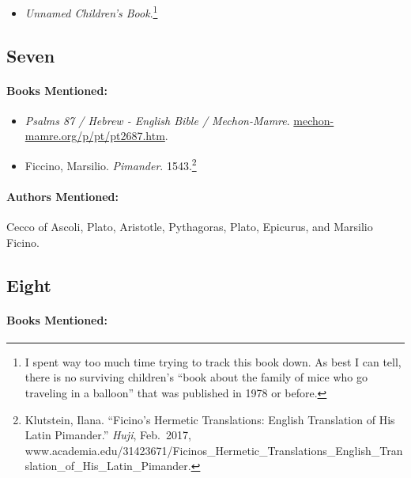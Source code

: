 \documentclass[12pt]{article}
\providecommand{\tightlist}{%
  \setlength{\itemsep}{0pt}\setlength{\parskip}{0pt}}
\begin{document}
\begin{itemize}
\tightlist
\item
  \emph{Unnamed Children's Book}.\footnote{I spent way too much time trying to track this book down. As best I can tell, there is no surviving children's ``book about the family of mice who go traveling in a balloon'' that was published in 1978 or before.}
\end{itemize}

\subsection{Seven}\label{seven-2}

\paragraph{Books Mentioned:}\label{books-mentioned-21}

\begin{itemize}
\tightlist
\item
  \emph{Psalms 87 / Hebrew - English Bible / Mechon-Mamre}. \url{mechon-mamre.org/p/pt/pt2687.htm}.
\item
  Ficcino, Marsilio. \emph{Pimander}. 1543.\footnote{Klutstein, Ilana. ``Ficino's Hermetic Translations: English Translation of His Latin Pimander.'' \emph{Huji}, Feb.~2017, www.academia.edu/31423671/Ficinos\_Hermetic\_Translations\_English\_Translation\_of\_His\_Latin\_Pimander.}
\end{itemize}

\paragraph{Authors Mentioned:}\label{authors-mentioned-15}

Cecco of Ascoli, Plato, Aristotle, Pythagoras, Plato, Epicurus, and Marsilio Ficino.

\subsection{Eight}\label{eight-1}

\paragraph{Books Mentioned:}\label{books-mentioned-22}
\end{document}
